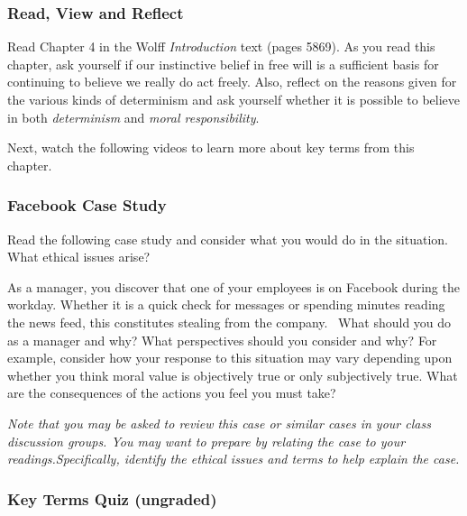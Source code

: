 \documentclass[
]{book}
\begin{document}
\begin{reflect}
\hypertarget{read-view-and-reflect-5}{%
\subsubsection*{Read, View and Reflect}\label{read-view-and-reflect-5}}

Read Chapter 4 in the Wolff \emph{Introduction} text (pages 5869). As you read this
chapter, ask yourself if our instinctive belief in free will is a sufficient
basis for continuing to believe we really do act freely. Also, reflect on the
reasons given for the various kinds of determinism and ask yourself whether it
is possible to believe in both \emph{determinism} and \emph{moral responsibility}.

Next, watch the following videos to learn more about key terms from this
chapter.

\hypertarget{facebook-case-study-1}{%
\subsubsection*{Facebook Case Study}\label{facebook-case-study-1}}

Read the following case study and consider what you would do in the situation.
What ethical issues arise?

As a manager, you discover that one of your employees is on Facebook during the workday. Whether it is a quick check for messages or spending minutes reading the news feed, this constitutes stealing from the company. ~What should you do as a manager and why? What perspectives should you consider and why? For example, consider how your response to this situation may vary depending upon whether you think moral value is objectively true or only subjectively true. What are the consequences of the actions you feel you must take?
\end{reflect}

\begin{caution}
\emph{Note that you may be asked to review this case or similar cases in your class discussion groups. You may want to prepare by relating the case to your readings.Specifically, identify the ethical issues and terms to help explain
the case.}
\end{caution}

\hypertarget{key-terms-quiz-ungraded-1}{%
\subsubsection*{Key Terms Quiz (ungraded)}\label{key-terms-quiz-ungraded-1}}
\end{document}
